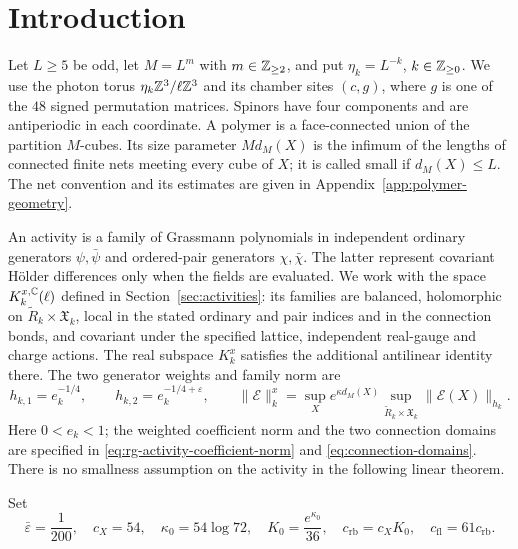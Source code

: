 \section{Introduction}
\label{sec:introduction}

Let \(L\ge5\) be odd, let \(M=L^m\) with \(m\in\mathbb Z_{\ge2}\), and put
\(\eta_k=L^{-k}\), \(k\in\mathbb Z_{\ge0}\). We use the photon torus
\(\eta_k\mathbb Z^3/\ell\mathbb Z^3\) and its chamber sites \((c,g)\), where \(g\)
is one of the \(48\) signed permutation matrices. Spinors have four
components and are antiperiodic in each coordinate. A polymer is a
face-connected union of the partition \(M\)-cubes. Its size parameter
\(Md_M(X)\) is the infimum of the lengths of connected finite nets
meeting every cube of \(X\); it is called small if \(d_M(X)\le L\).
The net convention and its estimates are given in
Appendix~\ref{app:polymer-geometry}.

An activity is a family of Grassmann polynomials in independent
ordinary generators \(\psi,\bar\psi\) and ordered-pair generators
\(\chi,\bar\chi\). The latter represent covariant H\"older differences
only when the fields are evaluated. We work with the space
\(K_k^{x,\mathbb C}(\ell)\) defined in
Section~\ref{sec:activities}: its families are balanced, holomorphic
on \(\widetilde R_k\times\mathfrak X_k\), local in the stated
ordinary and pair indices and in the connection bonds, and covariant
under the specified lattice, independent real-gauge and charge
actions. The real subspace \(K_k^x\) satisfies the additional
antilinear identity there. The two generator weights and family norm are
\[
 h_{k,1}=e_k^{-1/4},\qquad h_{k,2}=e_k^{-1/4+\varepsilon},\qquad
 \|\mathscr E\|_k^x
 =\sup_X e^{\kappa d_M(X)}
   \sup_{\widetilde R_k\times\mathfrak X_k}
                 \|\mathscr E(X)\|_{h_k}.
\]
Here \(0<e_k<1\); the weighted coefficient norm and the two
connection domains are specified in
\eqref{eq:rg-activity-coefficient-norm} and
\eqref{eq:connection-domains}. There is no smallness assumption
on the activity in the following linear theorem.

Set
\[
 \bar\varepsilon=\frac1{200},\quad c_X=54,\quad
 \kappa_0=54\log72,\quad K_0=\frac{e^{\kappa_0}}{36},\quad
 c_{\mathrm{rb}}=c_XK_0,\quad c_{\mathrm{fl}}=61c_{\mathrm{rb}}.
\]

